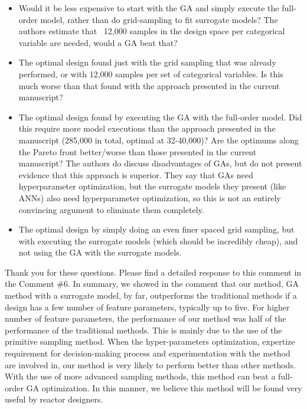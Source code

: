 \documentclass{ar2rc}
\begin{document}
    \begin{itemize}
        \item Would it be less expensive to start with the GA and simply execute
        the full-order model, rather than do grid-sampling to fit surrogate models? The authors estimate that ~12,000 samples in the design space per categorical variable are needed, would a GA beat that?
        \item The optimal design found just with the grid sampling that was
        already performed, or with 12,000 samples per set of categorical variables. Is this much worse than that found with the approach presented in the current manuscript?
        \item The optimal design found by executing the GA with the full-order
        model. Did this require more model executions than the approach
        presented in the manuscript (285,000 in total, optimal at 32-40,000)?
        Are the optimums along the Pareto front better/worse than those
        presented in the current manuscript? The authors do discuss
        disadvantages of GAs, but do not present evidence that this approach is
        superior. They say that GAs need hyperparameter optimization, but the
        surrogate models they present (like ANNs) also need hyperparameter
        optimization, so this is not an entirely convincing argument to
        eliminate them completely.
        \item The optimal design by simply doing an even finer spaced grid
        sampling, but with executing the surrogate models (which should be
        incredibly cheap), and not using the GA with the surrogate models.
    \end{itemize}

    \Response Thank you for these questions. Please find a detailed response to this comment in the Comment \#6. In summary, we showed in the comment that our method, GA method with a surrogate model, by far, outperforms the traditional methods if a design has a few number of feature parameters, typically up to five. For higher number of feature parameters, the performance of our method was half of the performance of the traditional methods. This is mainly due to the use of the primitive sampling method. When the hyper-parameters optimization, expertize requirement for decision-making process and experimentation with the method are involved in, our method is very likely to perform better than other methods. With the use of more advanced sampling methods, this method can beat a full-order GA optimization. In this manner, we believe this method will be found very useful by reactor designers. \\
\end{document}
